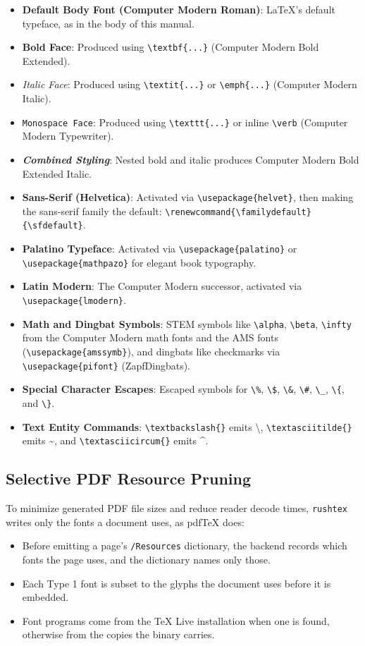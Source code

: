 \documentclass[11pt, a4paper]{article}
\begin{document}
\begin{itemize}
\item \textbf{Default Body Font (Computer Modern Roman)}: LaTeX's default typeface, as in the body of this manual.
\item \textbf{Bold Face}: Produced using \verb|\textbf{...}| (Computer Modern Bold Extended).
\item \textit{Italic Face}: Produced using \verb|\textit{...}| or \verb|\emph{...}| (Computer Modern Italic).
\item \texttt{Monospace Face}: Produced using \verb|\texttt{...}| or inline \verb|\verb| (Computer Modern Typewriter).
\item \textbf{\textit{Combined Styling}}: Nested bold and italic produces Computer Modern Bold Extended Italic.
\item \textbf{Sans-Serif (Helvetica)}: Activated via \verb|\usepackage{helvet}|, then making the sans-serif family the default: \verb|\renewcommand{\familydefault}{\sfdefault}|.
\item \textbf{Palatino Typeface}: Activated via \verb|\usepackage{palatino}| or \verb|\usepackage{mathpazo}| for elegant book typography.
\item \textbf{Latin Modern}: The Computer Modern successor, activated via \verb|\usepackage{lmodern}|.
\item \textbf{Math and Dingbat Symbols}: STEM symbols like \verb|\alpha|, \verb|\beta|, \verb|\infty| from the Computer Modern math fonts and the AMS fonts (\verb|\usepackage{amssymb}|), and dingbats like checkmarks via \verb|\usepackage{pifont}| (ZapfDingbats).
\item \textbf{Special Character Escapes}: Escaped symbols for \verb|\%|, \verb|\$|, \verb|\&|, \verb|\#|, \verb|\_|, \verb|\{|, and \verb|\}|.
\item \textbf{Text Entity Commands}: \verb|\textbackslash{}| emits \textbackslash{}, \verb|\textasciitilde{}| emits \textasciitilde{}, and \verb|\textasciicircum{}| emits \textasciicircum{}.
\end{itemize}

\subsection{Selective PDF Resource Pruning}
To minimize generated PDF file sizes and reduce reader decode times, \texttt{rushtex} writes only the fonts a document uses, as pdfTeX does:
\begin{itemize}
\item Before emitting a page's \texttt{/Resources} dictionary, the backend records which fonts the page uses, and the dictionary names only those.
\item Each Type 1 font is subset to the glyphs the document uses before it is embedded.
\item Font programs come from the TeX Live installation when one is found, otherwise from the copies the binary carries.
\end{itemize}
\end{document}

